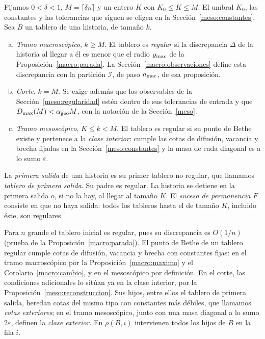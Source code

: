 \begin{definicion}\label{def:regular}
Fijamos $0<\delta<1$, $M=\lceil\delta n\rceil$ y un entero $K$ con $K_0\le K\le M$. El umbral $K_0$,
las constantes y las tolerancias que siguen se eligen en la Sección~\ref{meso:constantes}. Sea $B$ un
tablero de una historia, de tamaño $k$.
\begin{enumerate}[(a)]
\item \emph{Tramo macroscópico}, $k\ge M$. El tablero es \emph{regular} si la discrepancia $\Delta$
de la historia al llegar a él es menor que el radio $\varrho_{\rm mac}$ de la
Proposición~\ref{macro:parada}. La Sección~\ref{macro:observaciones} define esta discrepancia
con la partición $\mathcal I$, de paso $a_{\rm mac}$, de esa proposición.
\item \emph{Corte}, $k=M$. Se exige además que los observables de la
Sección~\ref{meso:regularidad} estén dentro de sus tolerancias de entrada y que
$D_{\max}(M)<\alpha_{\rm geo}M$, con la notación de la Sección~\ref{meso}.
\item \emph{Tramo mesoscópico}, $K\le k<M$. El tablero es regular si su punto de Bethe existe y
pertenece a la \emph{clase interior}: cumple las cotas de difusión, vacancia y brecha fijadas en la
Sección~\ref{meso:constantes} y la masa de cada diagonal es a lo sumo $\varepsilon$.
\end{enumerate}
La \emph{primera salida} de una historia es su primer tablero no regular, que llamamos \emph{tablero
de primera salida}. Su padre es regular. La historia se detiene en la primera salida o, si no la
hay, al llegar al tamaño $K$. El \emph{suceso de permanencia} $F$ consiste en que no haya salida:
todos los tableros hasta el de tamaño $K$, incluido éste, son regulares.
\end{definicion}
Para $n$ grande el tablero inicial es regular, pues su discrepancia es $O(1/n)$ (prueba de la
Proposición~\ref{macro:parada}). El punto de Bethe de un tablero regular cumple cotas de difusión,
vacancia y brecha con constantes fijas: en el tramo macroscópico por la Proposición~\ref{macro:maximo}
y el Corolario~\ref{macro:cambio}, y en el mesoscópico por definición. En el corte, las condiciones
adicionales lo sitúan ya en la clase interior, por la Proposición~\ref{meso:reconstruccion}. Sus
hijos, entre ellos el tablero de primera salida, heredan cotas del mismo tipo con constantes más
débiles, que llamamos \emph{cotas exteriores}; en el tramo mesoscópico, junto con una masa diagonal a
lo sumo $2\varepsilon$, definen la \emph{clase exterior}. En $\rho(B,i)$ intervienen todos los hijos
de $B$ en la fila $i$.


